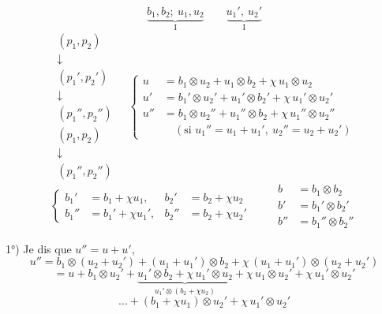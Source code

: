 \documentclass[11pt,a4paper]{article}
\begin{document}
\[
  \underbrace{b_1, b_2;\ u_1, u_2}_{\mathrm{I}}
  \qquad
  \underbrace{u_1',\ u_2'}_{\mathrm{I}}
\]
\[
  \begin{array}{c}
    (p_1,p_2) \\ \downarrow \\ (p_1',p_2') \\ \downarrow \\ (p_1'',p_2'') \\[2pt] \hline
    (p_1,p_2) \\ \downarrow \\ (p_1'',p_2'')
  \end{array}
  \quad
  \left\{
  \begin{aligned}
    u &= b_1 \otimes u_2 + u_1 \otimes b_2 + \chi\, u_1 \otimes u_2 \\
    u' &= b_1' \otimes u_2' + u_1' \otimes b_2' + \chi\, u_1' \otimes u_2' \\
    u'' &= b_1 \otimes u_2'' + u_1'' \otimes b_2 + \chi\, u_1'' \otimes u_2'' \\
    &\quad (\text{si } u_1'' = u_1 + u_1',\ u_2'' = u_2 + u_2')
  \end{aligned}
  \right.
\]
\[
  \left\{
  \begin{aligned}
    b_1' &= b_1 + \chi u_1, & b_2' &= b_2 + \chi u_2 \\
    b_1'' &= b_1' + \chi u_1', & b_2'' &= b_2 + \chi u_2'
  \end{aligned}
  \right.
  \qquad
  \begin{aligned}
    b &= b_1 \otimes b_2 \\
    b' &= b_1' \otimes b_2' \\
    b'' &= b_1'' \otimes b_2''
  \end{aligned}
\]

1°) Je dis que $u'' = u + u'$, 
\[
  u'' = b_1 \otimes (u_2 + u_2') + (u_1 + u_1') \otimes b_2
  + \chi\, (u_1 + u_1') \otimes (u_2 + u_2')
\]
\[
  = u + b_1 \otimes u_2' + \underbrace{u_1' \otimes b_2 + \chi\, u_1' \otimes u_2}_{u_1' \otimes (b_2 + \chi u_2)}
  + \chi\, u_1 \otimes u_2' + \chi\, u_1' \otimes u_2'
\]
\[
  \ldots + (b_1 + \chi u_1) \otimes u_2' + \chi\, u_1' \otimes u_2'
\]

\end{document}
